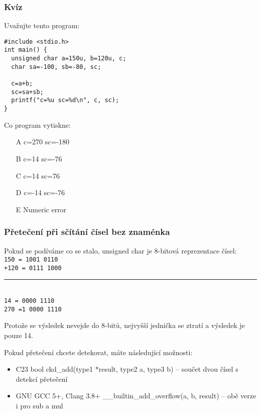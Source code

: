 \documentclass{beamer}
\begin{document}
\begin{frame}[fragile, shrink=5]
\frametitle{Kvíz}

Uvažujte tento program:
\begin{verbatim}
#include <stdio.h>
int main() {
  unsigned char a=150u, b=120u, c;
  char sa=-100, sb=-80, sc;
  
  c=a+b;
  sc=sa+sb;
  printf("c=%u sc=%d\n", c, sc);
}
\end{verbatim}

Co program vytiskne:
\begin{itemize}
\item[A] c=270 sc=-180
\item[B] c=14 sc=-76
\item[C] c=14 sc=76
\item[D] c=-14 sc=-76
\item[E] Numeric error
\end{itemize}
\end{frame}

\begin{frame}
\frametitle{Přetečení při sčítání čísel bez znaménka}


Pokud se podíváme co se stalo, unsigned char je 8-bitová reprezentace čísel:\\
\texttt{\phantom{x}150 = \phantom{x}1001 0110}\\
\texttt{+120 = \phantom{x}0111 1000}\vspace{-6pt}\\
\rule[0pt]{3.6cm}{0.4pt}\\
\texttt{\phantom{xx}14 = \phantom{x}0000 1110}\\
\texttt{\phantom{x}270 =1 0000 1110}

Protože se výsledek nevejde do 8-bitů, nejvyšší jednička se ztratí a výsledek je pouze 14.

Pokud přetečení chcete detekovat, máte následující možnosti:
\begin{itemize}
\item C23 bool ckd\_add(type1 *result, type2 a, type3 b) -- součet dvou čísel s detekcí přetečení
\item GNU GCC 5+, Clang 3.8+ \_\_builtin\_add\_overflow(a, b, result) -- obě verze i pro sub a mul
\end{itemize}
\end{frame}
\end{document}
